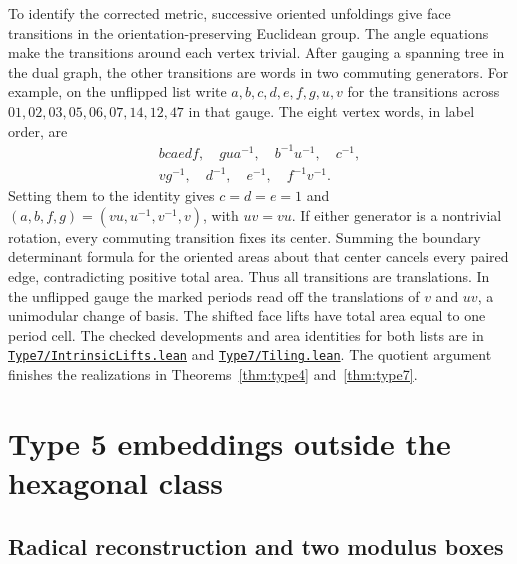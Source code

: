 \documentclass[11pt,letterpaper]{amsart}
\newcommand{\release}{bd3a0e03908481d738df30233cf95c641a1d3f71}
\newcommand{\src}[2]{\href{https://github.com/vltanh/lean4-origami-torus/blob/\release/#1}{\texttt{#2}}}
\begin{document}
To identify the corrected metric, successive oriented unfoldings
give face transitions in the orientation-preserving Euclidean
group. The angle equations make the transitions around each
vertex trivial. After gauging a spanning tree in the dual
graph, the other transitions are words in two commuting
generators. For example, on the unflipped list write \(a,b,c,d,e,f,g,u,v\)
for the transitions across \(01,02,03,05,06,07,14,12,47\)
in that gauge. The eight vertex words, in label order, are
\[
 \begin{gathered}
 bcaedf,\quad gua^{-1},\quad b^{-1}u^{-1},\quad c^{-1},\\
 vg^{-1},\quad d^{-1},\quad e^{-1},\quad f^{-1}v^{-1}.
 \end{gathered}
\]
Setting them to the identity gives \(c=d=e=1\) and
\((a,b,f,g)=(vu,u^{-1},v^{-1},v)\), with \(uv=vu\).
If either generator is a nontrivial rotation, every commuting
transition fixes its center. Summing the boundary determinant
formula for the oriented areas about that center cancels every
paired edge, contradicting positive total area. Thus all
transitions are translations. In the unflipped gauge the marked
periods read off the translations of \(v\) and \(uv\), a unimodular
change of basis. The shifted face lifts have total area equal to
one period cell. The checked developments and area identities for
both lists are in
\src{OrigamiTorus/EightVertex/Type7/IntrinsicLifts.lean}{Type7/IntrinsicLifts.lean}
and \src{OrigamiTorus/EightVertex/Type7/Tiling.lean}{Type7/Tiling.lean}.
The quotient argument finishes the realizations in
Theorems~\ref{thm:type4} and~\ref{thm:type7}.

\section{Type 5 embeddings outside the hexagonal class}\label{sec:radicals}

\subsection*{Radical reconstruction and two modulus boxes}
\end{document}
